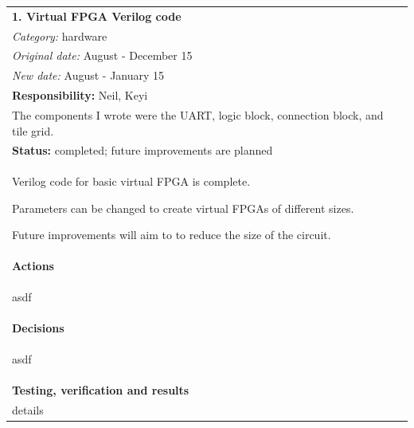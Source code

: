\documentclass[12pt,letterpaper]{article}
\begin{document}
\begin{tabular}{|p{6in}|}
\hline
\textbf{1. Virtual FPGA Verilog code} \\
\emph{Category:} hardware \\
\emph{Original date:} August - December 15 \\
\emph{New date:} August - January 15 \\
\hline
\textbf{Responsibility:} Neil, Keyi \\
The components I wrote were the UART, logic block, connection block, and tile grid. \\
\hline
\textbf{Status:} completed; future improvements are planned \\
\vspace{-2em}
\begin{itemize*}
\item Verilog code for basic virtual FPGA is complete.
\item Parameters can be changed to create virtual FPGAs of different sizes.
\item Future improvements will aim to to reduce the size of the circuit.
\end{itemize*} 
\vspace{-2em} \\
\hline
\textbf{Actions} \\
\vspace{-2em}
\begin{itemize*}
\item asdf
\end{itemize*} 
\vspace{-2em} \\
\hline
\textbf{Decisions} \\
\vspace{-2em}
\begin{itemize*}
\item asdf
\end{itemize*} 
\vspace{-2em} \\
\hline
\textbf{Testing, verification and results} \\
details \\
\hline
\end{tabular}
\end{document}
